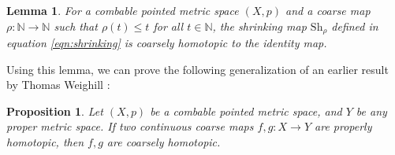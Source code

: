 \documentclass {amsart}
\newcommand {\N}        {\mathbb{N}}
\newcommand {\shr}      {\text {Sh} _{\rho}}
\newcommand {\adi}  [1] {\textcolor{blue}{Adi: #1}}
\newtheorem   {lemma}       [theorem] {Lemma}
\newtheorem   {proposition} [theorem] {Proposition}
\theoremstyle {definition}
\begin{document}
\begin{lemma} \label{lem:shrinking}
    For a combable pointed metric space \( (X, p) \) and a coarse map \( \rho : \N
    \to \N \) such that \( \rho (t) \leq t \) for all \( t \in \N \), the
    shrinking map \( \shr \) defined in equation \ref{eqn:shrinking} is coarsely homotopic
    to the identity map.
\end{lemma}


Using this lemma, we can prove the following generalization of an earlier result
by Thomas Weighill \cite{weighillLiftingCoarseHomotopies2019}:

\begin{proposition} \label{prop:proper-upgrade}
  Let \( (X, p) \) be a combable pointed metric space, and \( Y \) be any proper
  metric space. If two continuous coarse maps \( f,g : X \to Y \) are properly
  homotopic, then \( f,g \) are coarsely homotopic.
\end{proposition}
\end{document}
